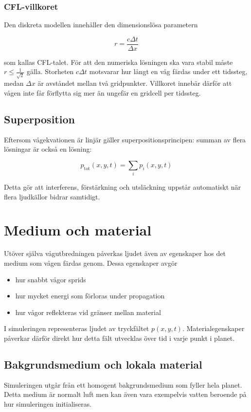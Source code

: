\documentclass[11pt,a4paper]{article}
\begin{document}
\subsubsection{CFL-villkoret}

Den diskreta modellen innehåller den dimensionslösa parametern

\[
r = \frac{c\Delta t}{\Delta x}
\]

som kallas CFL-talet.
För att den numeriska lösningen ska vara stabil måste
$r \le \frac{1}{\sqrt{2}}$ gälla.
Storheten $c\Delta t$ motsvarar hur långt en våg färdas under ett
tidssteg, medan $\Delta x$ är avståndet mellan två gridpunkter.
Villkoret innebär därför att vågen inte får förflytta sig mer än
ungefär en gridcell per tidssteg.


\subsection{Superposition}
Eftersom vågekvationen är linjär gäller superpositionsprincipen:
summan av flera lösningar är också en lösning:

\begin{equation}
p_{\text{tot}}(x,y,t) = \sum_i p_i(x,y,t)
\end{equation}

Detta gör att interferens, förstärkning och utsläckning uppstår
automatiskt när flera ljudkällor bidrar samtidigt.


\clearpage
\section{Medium och material}
Utöver själva vågutbredningen påverkas ljudet även av egenskaper
hos det medium som vågen färdas genom. Dessa egenskaper avgör

\begin{itemize}
\item hur snabbt vågor sprids
\item hur mycket energi som förloras under propagation
\item hur vågor reflekteras vid gränser mellan material
\end{itemize}

I simuleringen representeras ljudet av tryckfältet $p(x,y,t)$.
Materialegenskaper påverkar därför direkt hur detta fält utvecklas
över tid i varje punkt i planet.


\subsection{Bakgrundsmedium och lokala material}
Simuleringen utgår från ett homogent bakgrundsmedium som fyller
hela planet. Detta medium är normalt luft men kan även vara
exempelvis vatten beroende på hur simuleringen initialiseras.
\end{document}
